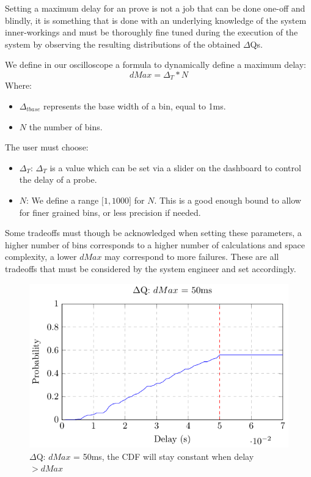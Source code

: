 Setting a maximum delay for an prove is not a job that can be done one-off and blindly, it is something that is done with an underlying knowledge of the system inner-workings and must be thoroughly fine tuned during the execution of the system by observing the resulting distributions of the obtained $\Delta$Qs. 

We define in our oscilloscope a formula to dynamically define a maximum delay:
\begin{equation}
    dMax = \Delta_{T} * N  
    \label{eq:dMaxU}
\end{equation}
Where:
\begin{itemize}
    \item $\Delta_{t base}$ represents the base width of a bin, equal to 1ms.
    \item $N$ the number of bins.
\end{itemize}

The user must choose:
\begin{itemize}
    \item $\Delta_T$: $\Delta_T$ is a value which can be set via a slider on the dashboard to control the delay of a probe. 
    \item $N$: We define a range $\lbrack 1, 1000 \rbrack$ for $N$. This is a good enough bound to allow for finer grained bins, or less precision if needed. 
\end{itemize}

Some tradeoffs must though be acknowledged when setting these parameters, a higher number of bins corresponds to a higher number of calculations and space complexity, a lower $dMax$ may correspond to more failures. These are all tradeoffs that must be considered by the system engineer and set accordingly.
    \begin{figure}[H]
        \begin{center}
            \includegraphics[scale = 1.2]{tikz/cdf_dmax.pdf}
        \end{center}
        \caption{$\Delta$Q: $dMax$ = 50ms, the CDF will stay constant when delay $> dMax$}
    \end{figure}

